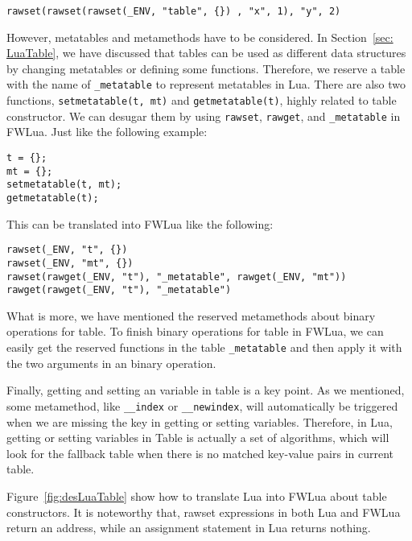 \begin{verbatim}
rawset(rawset(rawset(_ENV, "table", {}) , "x", 1), "y", 2)
\end{verbatim}

However, metatables and metamethods have to be considered. In Section~\ref{sec: LuaTable}, we have discussed that tables can be used as different data structures by changing metatables or defining some functions. Therefore, we reserve a table with the name of {\tt \_metatable} to represent metatables in Lua. There are also two functions, {\tt setmetatable(t, mt)} and {\tt getmetatable(t)}, highly related to table constructor. We can desugar them by using {\tt rawset}, {\tt rawget}, and {\tt \_metatable} in FWLua. Just like the following example:

\begin{verbatim}
t = {};
mt = {};
setmetatable(t, mt);
getmetatable(t);
\end{verbatim}

This can be translated into FWLua like the following:

\begin{verbatim}
rawset(_ENV, "t", {})
rawset(_ENV, "mt", {})
rawset(rawget(_ENV, "t"), "_metatable", rawget(_ENV, "mt"))
rawget(rawget(_ENV, "t"), "_metatable")
\end{verbatim}


What is more, we have mentioned the reserved metamethods about binary operations for table. To finish binary operations for table in FWLua, we can easily get the reserved functions in the table {\tt \_metatable} and then apply it with the two arguments in an binary operation.

Finally, getting and setting an variable in table is a key point. As we mentioned, some metamethod, like {\tt \_\_index} or {\tt \_\_newindex}, will automatically be triggered when we are missing the key in getting or setting variables. Therefore, in Lua, getting or setting variables in Table is actually a set of algorithms, which will look for the fallback table when there is no matched key-value pairs in current table.


Figure~\ref{fig:desLuaTable} show how to translate Lua into FWLua about table constructors. It is noteworthy that, rawset expressions in both Lua and FWLua return an address, while an assignment statement in Lua returns nothing.

